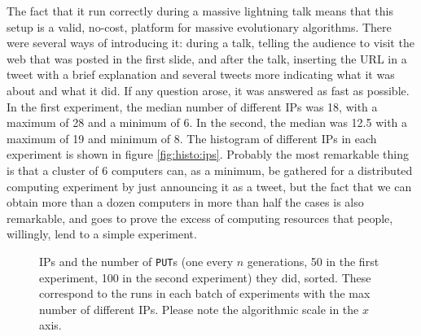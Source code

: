 \documentclass{sig-alternate}
\begin{document}
The fact that it run correctly during a massive lightning talk means that this setup is a
valid, no-cost, platform for massive evolutionary algorithms. There
were several ways of introducing it: during a talk, telling the
audience to visit the web that was posted in the first slide, and
after the talk, inserting the URL in a tweet with a brief explanation
and several tweets more indicating what it was about and what it
did. If any question arose, it was answered as fast as possible. In
the first experiment, the median number of different IPs was 18, with
a maximum of 28 and a minimum of 6. In the second, the median was 12.5
with a maximum of 19 and minimum of 8. The histogram of different IPs
in each experiment is shown in figure \ref{fig:histo:ips}. Probably
the most remarkable thing is that a cluster of 6 computers can, as a
minimum, be gathered for a distributed computing experiment by just
announcing it as a tweet, but the fact that we can obtain more than a
dozen computers in more than half the cases is also remarkable, and
goes to prove the excess of computing resources that people,
willingly, lend to a simple experiment.
%
\begin{figure}[htb]
        \centering
        \caption{IPs and the number of {\tt PUT}s (one every $n$
          generations, 50 in the first experiment, 100 in the second
          experiment) they did, sorted. These correspond to the runs
          in each batch of experiments with the max number of
          different IPs. Please note the algorithmic scale in the $x$ axis.}\label{fig:dist}
\end{figure}
\end{document}
